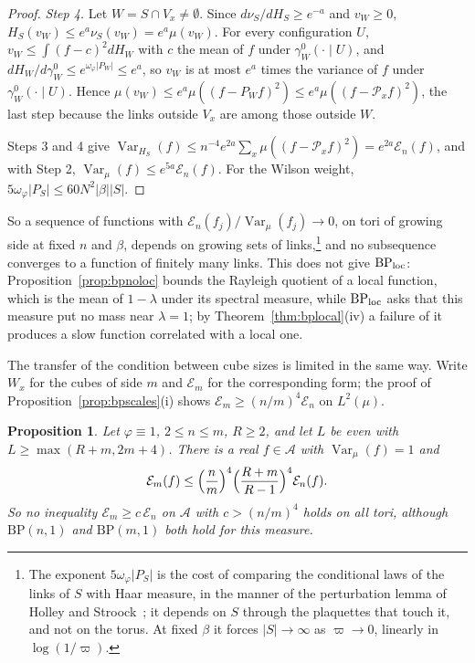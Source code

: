 \documentclass[aps,prd,twocolumn,superscriptaddress,nofootinbib,longbibliography,floatfix,amsmath,amssymb,10pt]{revtex4-2}
\newtheorem{proposition}[theorem]{Proposition}
\theoremstyle{definition}
\theoremstyle{remark}
\newcommand{\Var}{\operatorname{Var}}
\begin{document}
\begin{proof}
\emph{Step 4.} Let $W=S\cap V_x\ne\emptyset$. Since $d\nu_S/dH_S\ge e^{-a}$
and $v_W\ge0$, $H_S(v_W)\le e^a\nu_S(v_W)=e^a\mu(v_W)$. For every configuration $U$,
$v_W\le\int(f-c)^2dH_W$ with $c$ the mean of $f$ under $\gamma^0_W(\cdot
\mid U)$, and $dH_W/d\gamma^0_W\le e^{\omega_\varphi\lvert P_W\rvert}\le
e^a$, so $v_W$ is at most $e^a$ times the variance of $f$ under
$\gamma^0_W(\cdot\mid U)$. Hence $\mu(v_W)\le e^a\mu((f-P_Wf)^2)\le e^a\mu
((f-\mathcal P_xf)^2)$, the last step because the links outside $V_x$ are
among those outside $W$.

Steps 3 and 4 give $\Var_{H_S}(f)\le n^{-4}e^{2a}\sum_x\mu((f-\mathcal P_xf)^2
)=e^{2a}\mathcal E_n(f)$, and with Step 2, $\Var_\mu(f)\le e^{5a}\mathcal
E_n(f)$. For the Wilson weight, $5\omega_\varphi\lvert P_S\rvert\le60N^2
\lvert\beta\rvert\lvert S\rvert$.
\end{proof}

So a sequence of functions with $\mathcal E_n(f_j)/\Var_\mu(f_j)\to0$, on
tori of growing side at fixed $n$ and $\beta$, depends on growing sets of
links,\footnote{The exponent $5\omega_\varphi\lvert P_S\rvert$ is the cost
of comparing the conditional laws of the links of $S$ with Haar measure,
in the manner of the perturbation lemma of Holley and
Stroock~\cite{HS87}; it depends on $S$ through the plaquettes that touch
it, and not on the torus. At fixed $\beta$ it forces
$\lvert S\rvert\to\infty$ as $\varpi\to0$, linearly in $\log(1/\varpi)$.} and no subsequence converges to a function of finitely many links.
This does not give $\mathrm{BP}_{\rm loc}$: Proposition~\ref{prop:bpnoloc}
bounds the Rayleigh quotient of a local function, which is the mean of
$1-\lambda$ under its spectral measure, while $\mathrm{BP}_{\rm loc}$ asks
that this measure put no mass near $\lambda=1$; by
Theorem~\ref{thm:bplocal}(iv) a failure of it produces a slow function
correlated with a local one.

The transfer of the condition between cube sizes is limited in the
same way. Write $W_x$ for the cubes of side $m$ and $\mathcal E_m$ for the
corresponding form; the proof of Proposition~\ref{prop:bpscales}(i) shows
$\mathcal E_m\ge(n/m)^4\mathcal E_n$ on $L^2(\mu)$.

\begin{proposition}\label{prop:bpsharp}
Let $\varphi\equiv1$, $2\le n\le m$, $R\ge2$, and let $L$ be even with
$L\ge\max(R+m,2m+4)$. There is a real $f\in\mathcal A$ with $\Var_\mu(f)=1$
and
\[
\mathcal E_m(f)\le\Bigl(\frac nm\Bigr)^4\Bigl(\frac{R+m}{R-1}\Bigr)^4
\mathcal E_n(f).
\]
So no inequality $\mathcal E_m\ge c\,\mathcal E_n$ on $\mathcal A$ with $c>
(n/m)^4$ holds on all tori, although $\mathrm{BP}(n,1)$ and $\mathrm{BP}(m,1)$
both hold for this measure.
\end{proposition}
\end{document}
